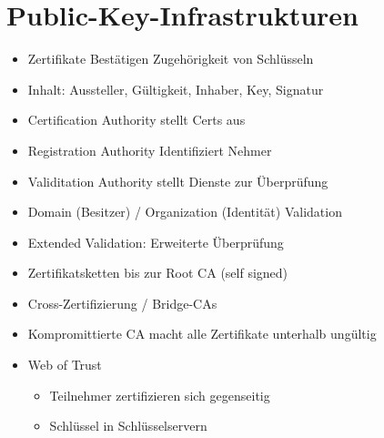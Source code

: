 \documentclass[11pt, paper=a4, twocolumn]{scrartcl}
\begin{document}
	\section{Public-Key-Infrastrukturen}
		\begin{itemize}
			\item Zertifikate Bestätigen Zugehörigkeit von Schlüsseln
			\item Inhalt: Aussteller, Gültigkeit, Inhaber, Key, Signatur
			\item Certification Authority stellt Certs aus
			\item Registration Authority Identifiziert Nehmer
			\item Validitation Authority stellt Dienste zur Überprüfung
			\item Domain (Besitzer) / Organization (Identität) Validation
			\item Extended Validation: Erweiterte Überprüfung
			\item Zertifikatsketten bis zur Root CA (self signed)
			\item Cross-Zertifizierung / Bridge-CAs
			\item Kompromittierte CA macht alle Zertifikate unterhalb ungültig
			\item Web of Trust
				\begin{itemize}
					\item Teilnehmer zertifizieren sich gegenseitig
					\item Schlüssel in Schlüsselservern
				\end{itemize}
		\end{itemize}
	
\end{document}
